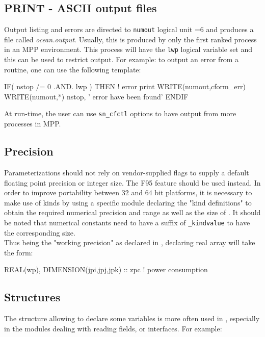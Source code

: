 \subsection{PRINT - ASCII output files}

Output listing and errors are directed to \texttt{numout} logical unit =6 and produces a
file called \textit{ocean.output}. Usually, this is produced by only the first ranked
process in an MPP environment. This process will have the \texttt{lwp} logical variable
set and this can be used to restrict output. For example: to output an error from a
routine, one can use the following template:

\begin{forlines}
IF( nstop /= 0 .AND. lwp ) THEN   ! error print
   WRITE(numout,cform_err)
   WRITE(numout,*) nstop, ' error have been found'
ENDIF
\end{forlines}

At run-time, the user can use \texttt{sn\_cfctl} options to have output from more processes in MPP.

\subsection{Precision}

Parameterizations should not rely on vendor-supplied flags to supply a default floating
point precision or integer size.  The F95  feature should be used instead.
In order to improve portability between 32 and 64 bit platforms, it is necessary to make
use of kinds by using a specific module  declaring the "kind
definitions" to obtain the required numerical precision and range as well as the size of
.  It should be noted that numerical constants need to have a suffix of
\texttt{\_kindvalue} to have the corresponding size. \\ Thus  being the
"working precision" as declared in , declaring real array
 will take the form:

\begin{forlines}
REAL(wp), DIMENSION(jpi,jpj,jpk) ::  zpc      ! power consumption
\end{forlines}

\subsection{Structures}

The  structure allowing to declare some variables is more often used in \NEMO,
especially in the modules dealing with reading fields, or interfaces.
For example:

